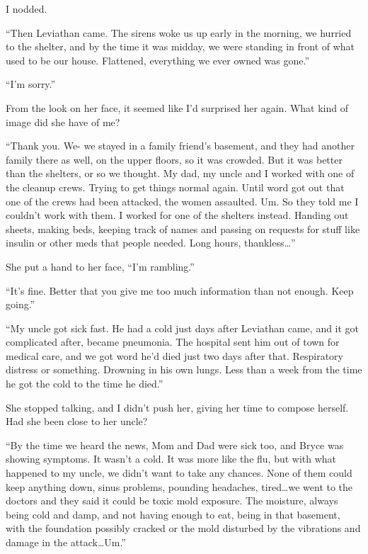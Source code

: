I nodded.



``Then Leviathan came.  The sirens woke us up early in the morning, we hurried to the shelter, and by the time it was midday, we were standing in front of what used to be our house.  Flattened, everything we ever owned was gone.''



``I'm sorry.''



From the look on her face, it seemed like I'd surprised her again.  What kind of image did she have of me?



``Thank you.  We- we stayed in a family friend's basement, and they had another family there as well, on the upper floors, so it was crowded.  But it was better than the shelters, or so we thought.  My dad, my uncle and I worked with one of the cleanup crews.  Trying to get things normal again.  Until word got out that one of the crews had been attacked, the women assaulted.  Um.  So they told me I couldn't work with them.  I worked for one of the shelters instead.  Handing out sheets, making beds, keeping track of names and passing on requests for stuff like insulin or other meds that people needed.  Long hours, thankless\ldots''



She put a hand to her face, ``I'm rambling.''



``It's fine.  Better that you give me too much information than not enough.  Keep going.''



``My uncle got sick fast.  He had a cold just days after Leviathan came, and it got complicated after, became pneumonia.  The hospital sent him out of town for medical care, and we got word he'd died just two days after that.  Respiratory distress or something.  Drowning in his own lungs.  Less than a week from the time he got the cold to the time he died.''



She stopped talking, and I didn't push her, giving her time to compose herself.  Had she been close to her uncle?



``By the time we heard the news, Mom and Dad were sick too, and Bryce was showing symptoms.  It wasn't a cold.  It was more like the flu, but with what happened to my uncle, we didn't want to take any chances.  None of them could keep anything down, sinus problems, pounding headaches, tired\ldots we went to the doctors and they said it could be toxic mold exposure.  The moisture, always being cold and damp, and not having enough to eat, being in that basement, with the foundation possibly cracked or the mold disturbed by the vibrations and damage in the attack\ldots Um.''



